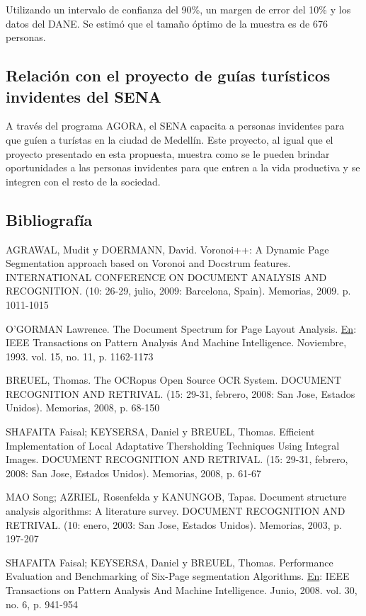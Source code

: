 \documentclass[a4paper, 12pt, oneside]{article}
\begin{document}
	Utilizando un intervalo de confianza del 90\%, un margen de error del 10\% y los datos del DANE. Se estimó que el tamaño óptimo de la muestra es de 676 personas.
	
	\subsection{Relación con el proyecto de guías turísticos invidentes del SENA}
	A través del programa AGORA, el SENA capacita a personas invidentes para que guíen a turístas en la ciudad de Medellín. Este proyecto, al igual que el proyecto presentado en esta propuesta, muestra como se le pueden brindar oportunidades a las personas invidentes para que entren a la vida productiva y se integren con el resto de la sociedad.
	
	\clearpage
	
	\begin{center}
	\section{Bibliografía}
	\end{center}
	AGRAWAL, Mudit y DOERMANN, David. Voronoi++: A Dynamic Page Segmentation approach based on Voronoi and Docstrum features. INTERNATIONAL CONFERENCE ON DOCUMENT ANALYSIS AND RECOGNITION. (10: 26-29, julio, 2009: Barcelona, Spain). Memorias, 2009. p. 1011-1015
	
	O'GORMAN Lawrence. The Document Spectrum for Page Layout Analysis. \underline{En}: IEEE Transactions on Pattern Analysis And Machine Intelligence. Noviembre, 1993. vol. 15, no. 11, p. 1162-1173
	
	BREUEL, Thomas. The OCRopus Open Source OCR System. DOCUMENT RECOGNITION AND RETRIVAL. (15: 29-31, febrero, 2008: San Jose, Estados Unidos). Memorias, 2008, p. 68-150
	
	SHAFAITA Faisal; KEYSERSA, Daniel y BREUEL, Thomas. Efficient Implementation of Local Adaptative Thersholding Techniques Using Integral Images. DOCUMENT RECOGNITION AND RETRIVAL. (15: 29-31, febrero, 2008: San Jose, Estados Unidos). Memorias, 2008, p. 61-67
	
	MAO Song; AZRIEL, Rosenfelda y KANUNGOB, Tapas. Document structure analysis algorithms: A literature survey. DOCUMENT RECOGNITION AND RETRIVAL. (10: enero, 2003: San Jose, Estados Unidos). Memorias, 2003, p. 197-207
	
	SHAFAITA Faisal; KEYSERSA, Daniel y BREUEL, Thomas. Performance Evaluation and Benchmarking of Six-Page segmentation Algorithms. \underline{En}: IEEE Transactions on Pattern Analysis And Machine Intelligence. Junio, 2008. vol. 30, no. 6, p. 941-954
	
\end{document}
